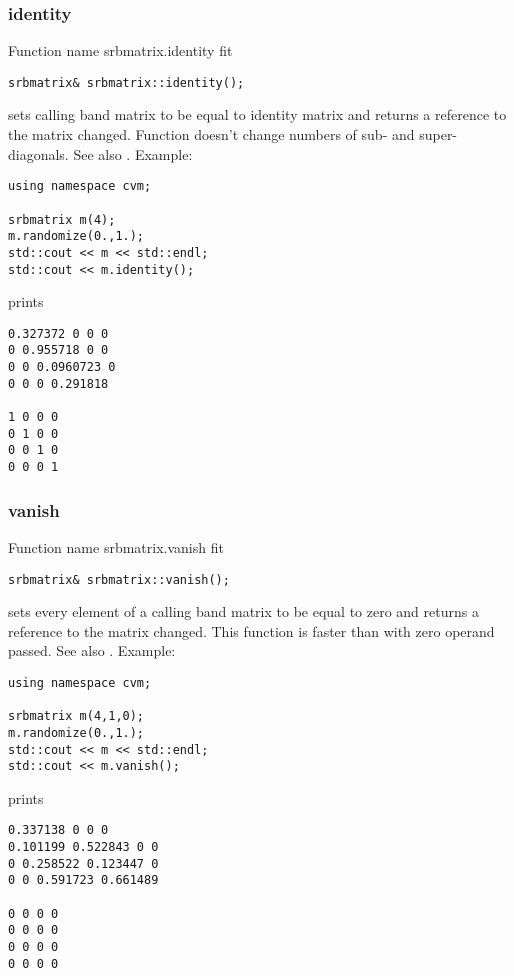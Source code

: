 \subsubsection{identity}
Function%
\pdfdest name {srbmatrix.identity} fit
\begin{verbatim}
srbmatrix& srbmatrix::identity();
\end{verbatim}
sets  calling band matrix to be equal to identity matrix
and returns a reference to
the matrix changed. 
Function doesn't change
numbers of sub- and super-diagonals.
See also .
Example:
\begin{Verbatim}
using namespace cvm;

srbmatrix m(4);
m.randomize(0.,1.);
std::cout << m << std::endl;
std::cout << m.identity();
\end{Verbatim}
prints
\begin{Verbatim}
0.327372 0 0 0
0 0.955718 0 0
0 0 0.0960723 0
0 0 0 0.291818

1 0 0 0
0 1 0 0
0 0 1 0
0 0 0 1
\end{Verbatim}
\newpage





\subsubsection{vanish}
Function%
\pdfdest name {srbmatrix.vanish} fit
\begin{verbatim}
srbmatrix& srbmatrix::vanish();
\end{verbatim}
sets every element of a calling band matrix to be equal to zero
and returns a reference to
the matrix changed. This function is faster
than
with zero operand passed.
See also .
Example:
\begin{Verbatim}
using namespace cvm;

srbmatrix m(4,1,0);
m.randomize(0.,1.);
std::cout << m << std::endl;
std::cout << m.vanish();
\end{Verbatim}
prints
\begin{Verbatim}
0.337138 0 0 0
0.101199 0.522843 0 0
0 0.258522 0.123447 0
0 0 0.591723 0.661489

0 0 0 0
0 0 0 0
0 0 0 0
0 0 0 0
\end{Verbatim}
\newpage




